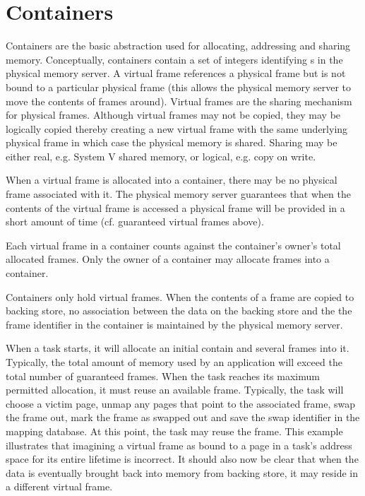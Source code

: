 \section{Containers}

Containers are the basic abstraction used for allocating, addressing
and sharing memory.  Conceptually, containers contain a set of
integers identifying s in the physical memory
server.  A virtual frame references a physical frame but is not bound
to a particular physical frame (this allows the physical memory server
to move the contents of frames around).  Virtual frames are the
sharing mechanism for physical frames.  Although virtual frames may
not be copied, they may be logically copied thereby creating a new
virtual frame with the same underlying physical frame in which case
the physical memory is shared.  Sharing may be either real,
e.g. System V shared memory, or logical, e.g. copy on write.

When a virtual frame is allocated into a container, there may be no
physical frame associated with it.  The physical memory server
guarantees that when the contents of the virtual frame is accessed a
physical frame will be provided in a short amount of time
(cf. guaranteed virtual frames above).

Each virtual frame in a container counts against the container's
owner's total allocated frames.  Only the owner of a container may
allocate frames into a container.

Containers only hold virtual frames.  When the contents of a frame are
copied to backing store, no association between the data on the
backing store and the the frame identifier in the container is
maintained by the physical memory server.

When a task starts, it will allocate an initial contain and several
frames into it.  Typically, the total amount of memory used by an
application will exceed the total number of guaranteed frames.  When
the task reaches its maximum permitted allocation, it must reuse an
available frame.  Typically, the task will choose a victim page, unmap
any pages that point to the associated frame, swap the frame out, mark
the frame as swapped out and save the swap identifier in the mapping
database.  At this point, the task may reuse the frame.  This example
illustrates that imagining a virtual frame as bound to a page in a
task's address space for its entire lifetime is incorrect.  It should
also now be clear that when the data is eventually brought back into
memory from backing store, it may reside in a different virtual frame.

